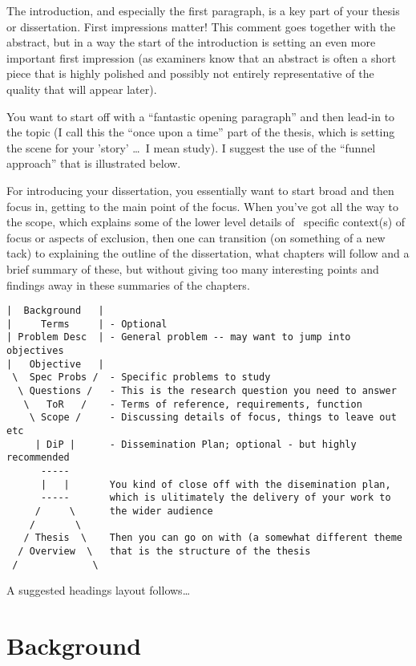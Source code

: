 The introduction, and especially the first paragraph, is a key part of your thesis or dissertation.  First impressions matter!  This comment goes together with the abstract, but in a way the start of the introduction is setting an even more important first impression (as examiners know that an abstract is often a short piece that is highly polished and possibly not entirely representative of the quality that will appear later).

You want to start off with a ``fantastic opening paragraph'' and then lead-in to the topic (I call this the ``once upon a time'' part of the thesis, which is setting the scene for your 'story' \ldots\ I mean study). I suggest the use of the ``funnel approach'' that is illustrated below. 

For introducing your dissertation, you essentially want to start broad and then focus in, getting to the main point of the focus.  When you've got all the way to the scope, which explains some of the lower level details of \eg~specific context(s) of focus or aspects of exclusion, then one can transition (on something of a new tack) to explaining the outline of the dissertation, what chapters will follow and a brief summary of these, but without giving too many interesting points and findings away in these summaries of the chapters. 

\begin{verbatim}
|  Background   | 
|     Terms     | - Optional
| Problem Desc  | - General problem -- may want to jump into objectives
|   Objective   | 
 \  Spec Probs /  - Specific problems to study
  \ Questions /   - This is the research question you need to answer
   \   ToR   /    - Terms of reference, requirements, function
    \ Scope /     - Discussing details of focus, things to leave out etc
     | DiP |      - Dissemination Plan; optional - but highly recommended
      -----       
      |   |       You kind of close off with the disemination plan,
      -----       which is ulitimately the delivery of your work to 
     /     \      the wider audience
    /       \     
   / Thesis  \    Then you can go on with (a somewhat different theme
  / Overview  \   that is the structure of the thesis
 /             \
\end{verbatim}

{\color{red} A suggested headings layout follows\ldots}

\section{Background}

